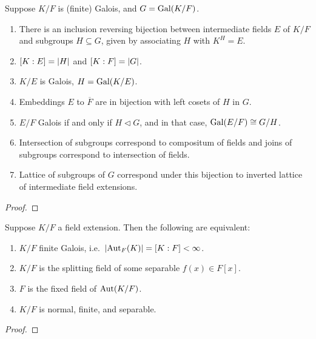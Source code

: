 \begin{theorem}\label{thm:ftgt}
    Suppose \(K/F\) is (finite) Galois, and \(G = \operatorname{Gal}(K/F)\).
    \begin{enumerate}[label={(\alph*)}, itemsep=0mm]
        \item There is an inclusion reversing bijection
            between intermediate fields \(E\) of \(K/F\) and subgroups \(H \subseteq G\),
            given by associating \(H\) with \(K^H = E\).
        \item \([K:E] = \abs{H}\) and \([K:F] = \abs{G}\).
        \item \(K/E\) is Galois, \(H = \operatorname{Gal}(K/E)\).
        \item Embeddings \(E\) to \(\overline{F}\) are in bijection with
            left cosets of \(H\) in \(G\).
        \item \(E/F\) Galois if and only if \(H \lhd G\),
            and in that case, \(\operatorname{Gal}(E/F) \cong G/H\).
        \item Intersection of subgroups correspond to compositum of fields
            and joins of subgroups correspond to intersection of fields.
        \item Lattice of subgroups of \(G\) correspond under this bijection
            to inverted lattice of intermediate field extensions.
    \end{enumerate}
\end{theorem}
\begin{proof}
\end{proof}

\begin{theorem}
    Suppose \(K/F\) a field extension.
    Then the following are equivalent:
    \begin{enumerate}[label={(\alph*)}, itemsep=0mm]
        \item \(K/F\) finite Galois, i.e.\ \(\abs{\operatorname{Aut}_F(K)} = [K:F] < \infty\).
        \item \(K/F\) is the splitting field of some separable \(f(x) \in F[x]\).
        \item \(F\) is the fixed field of \(\operatorname{Aut}(K/F)\).
        \item \(K/F\) is normal, finite, and separable.
    \end{enumerate}
\end{theorem}
\begin{proof}
\end{proof}

